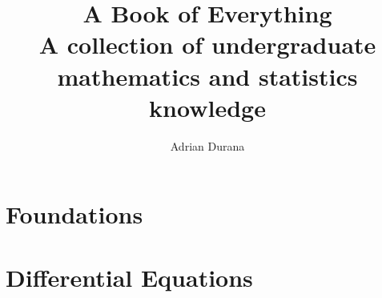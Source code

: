 \documentclass[11pt, a4paper, twoside, openany]{book}
\title{\Huge A Book of Everything\\[0.5em]\Large A collection of undergraduate mathematics and statistics knowledge}
\author{Adrian Durana}
\date{}
\begin{document}
\frontmatter
\maketitle

\tableofcontents

\mainmatter

\part{Foundations}

\part{Differential Equations}
\end{document}
